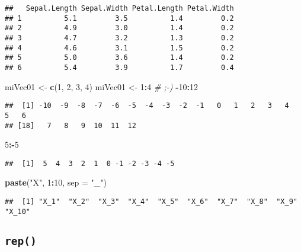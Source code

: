 \documentclass[]{book}
\newenvironment{Shaded}{\begin{snugshade}}{\end{snugshade}}
\newcommand{\KeywordTok}[1]{\textcolor[rgb]{0.13,0.29,0.53}{\textbf{#1}}}
\newcommand{\DataTypeTok}[1]{\textcolor[rgb]{0.13,0.29,0.53}{#1}}
\newcommand{\DecValTok}[1]{\textcolor[rgb]{0.00,0.00,0.81}{#1}}
\newcommand{\StringTok}[1]{\textcolor[rgb]{0.31,0.60,0.02}{#1}}
\newcommand{\CommentTok}[1]{\textcolor[rgb]{0.56,0.35,0.01}{\textit{#1}}}
\newcommand{\OperatorTok}[1]{\textcolor[rgb]{0.81,0.36,0.00}{\textbf{#1}}}
\newcommand{\NormalTok}[1]{#1}
\theoremstyle{definition}
\theoremstyle{definition}
\theoremstyle{definition}
\theoremstyle{remark}
\begin{document}
\begin{verbatim}
##   Sepal.Length Sepal.Width Petal.Length Petal.Width
## 1          5.1         3.5          1.4         0.2
## 2          4.9         3.0          1.4         0.2
## 3          4.7         3.2          1.3         0.2
## 4          4.6         3.1          1.5         0.2
## 5          5.0         3.6          1.4         0.2
## 6          5.4         3.9          1.7         0.4
\end{verbatim}

\begin{Shaded}
\begin{Highlighting}[]
\NormalTok{miVec01 <-}\StringTok{ }\KeywordTok{c}\NormalTok{(}\DecValTok{1}\NormalTok{, }\DecValTok{2}\NormalTok{, }\DecValTok{3}\NormalTok{, }\DecValTok{4}\NormalTok{)}
\NormalTok{miVec01 <-}\StringTok{ }\DecValTok{1}\OperatorTok{:}\DecValTok{4} \CommentTok{# ;-)}
\OperatorTok{-}\DecValTok{10}\OperatorTok{:}\DecValTok{12}
\end{Highlighting}
\end{Shaded}

\begin{verbatim}
##  [1] -10  -9  -8  -7  -6  -5  -4  -3  -2  -1   0   1   2   3   4   5   6
## [18]   7   8   9  10  11  12
\end{verbatim}

\begin{Shaded}
\begin{Highlighting}[]
\DecValTok{5}\OperatorTok{:-}\DecValTok{5}
\end{Highlighting}
\end{Shaded}

\begin{verbatim}
##  [1]  5  4  3  2  1  0 -1 -2 -3 -4 -5
\end{verbatim}

\begin{Shaded}
\begin{Highlighting}[]
\KeywordTok{paste}\NormalTok{(}\StringTok{"X"}\NormalTok{, }\DecValTok{1}\OperatorTok{:}\DecValTok{10}\NormalTok{, }\DataTypeTok{sep =} \StringTok{"_"}\NormalTok{)}
\end{Highlighting}
\end{Shaded}

\begin{verbatim}
##  [1] "X_1"  "X_2"  "X_3"  "X_4"  "X_5"  "X_6"  "X_7"  "X_8"  "X_9"  "X_10"
\end{verbatim}

\subsection{\texorpdfstring{\texttt{rep()}}{rep()}}\label{l015rep}
\end{document}
